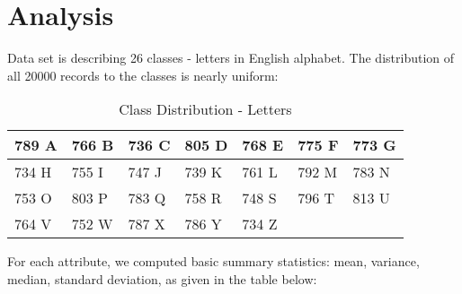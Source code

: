 \section*{Analysis}

Data set is describing 26 classes - letters in English alphabet. The distribution
of all 20000 records to the classes is nearly uniform: \\

\begin{table}[ht!]
    \centering
    \begin{tabular}{|l|l|l|l|l|l|l|}
         \hline
            789 A  &  766 B  &   736 C  &   805 D  &  768 E   &  775 F  &   773 G \\ \hline
            734 H  &  755 I  &   747 J  &   739 K  &  761 L   &  792 M  &   783 N \\ \hline
            753 O  &  803 P  &   783 Q  &   758 R  &  748 S   &  796 T  &   813 U \\ \hline
            764 V  &  752 W  &   787 X  &   786 Y  &  734 Z   &         &         \\ \hline
    \end{tabular}
    \caption{Class Distribution - Letters}
\end{table}

\noindent
For each attribute, we computed basic summary statistics: mean, variance,
median, standard deviation, as given in the table below: \\

